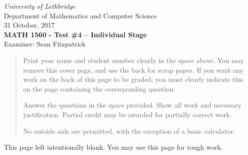 \documentclass[12pt]{article}
\newcommand{\skipline}{\vspace{12pt}}
\begin{document}
\author{Instructor: Sean Fitzpatrick}
\thispagestyle{plain}
\begin{center}
\emph{University of Lethbridge}\\
Department of Mathematics and Computer Science\\
31 October, 2017\\
{\bf MATH 1560 - Test \#4 -- Individual Stage}\\
Examiner: Sean Fitzpatrick
\end{center}



\vspace{0.1in}

\vspace*{\fill}

\begin{quote}
Print your name and student number clearly in the space above. You may remove this cover page, and use the back for scrap paper. If you want any work on the back of this page to be graded, you must clearly indicate this on the page containing the corresponding question.

\medskip

Answer the questions in the space provided. Show all work and necessary justification. Partial credit may be awarded for partially correct work.
 
\medskip

No outside aids are permitted, with the exception of a basic calculator. 
\end{quote}



\newpage

This page left intentionally blank. You may use this page for rough work.
\newpage
\end{document}
